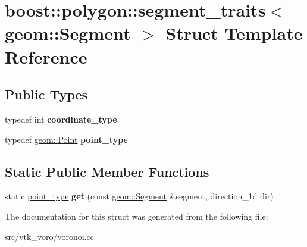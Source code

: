 \hypertarget{structboost_1_1polygon_1_1segment__traits_3_01geom_1_1Segment_01_4}{}\section{boost\+:\+:polygon\+:\+:segment\+\_\+traits$<$ geom\+:\+:Segment $>$ Struct Template Reference}
\label{structboost_1_1polygon_1_1segment__traits_3_01geom_1_1Segment_01_4}
\subsection*{Public Types}
\begin{DoxyCompactItemize}
\item 
typedef int {\bfseries coordinate\+\_\+type}\hypertarget{structboost_1_1polygon_1_1segment__traits_3_01geom_1_1Segment_01_4_aef10b119d293ee1b971cb30282b38d57}{}\label{structboost_1_1polygon_1_1segment__traits_3_01geom_1_1Segment_01_4_aef10b119d293ee1b971cb30282b38d57}

\item 
typedef \hyperlink{classgeom_1_1Point}{geom\+::\+Point} {\bfseries point\+\_\+type}\hypertarget{structboost_1_1polygon_1_1segment__traits_3_01geom_1_1Segment_01_4_a56d0a93ee1eaf1004cea07902f263320}{}\label{structboost_1_1polygon_1_1segment__traits_3_01geom_1_1Segment_01_4_a56d0a93ee1eaf1004cea07902f263320}

\end{DoxyCompactItemize}
\subsection*{Static Public Member Functions}
\begin{DoxyCompactItemize}
\item 
static \hyperlink{classgeom_1_1Point}{point\+\_\+type} {\bfseries get} (const \hyperlink{classgeom_1_1Segment}{geom\+::\+Segment} \&segment, direction\+\_\+1d dir)\hypertarget{structboost_1_1polygon_1_1segment__traits_3_01geom_1_1Segment_01_4_a2d6a3717b095e0151f90931d3797c262}{}\label{structboost_1_1polygon_1_1segment__traits_3_01geom_1_1Segment_01_4_a2d6a3717b095e0151f90931d3797c262}

\end{DoxyCompactItemize}


The documentation for this struct was generated from the following file\+:\begin{DoxyCompactItemize}
\item 
src/vtk\+\_\+voro/voronoi.\+cc\end{DoxyCompactItemize}
